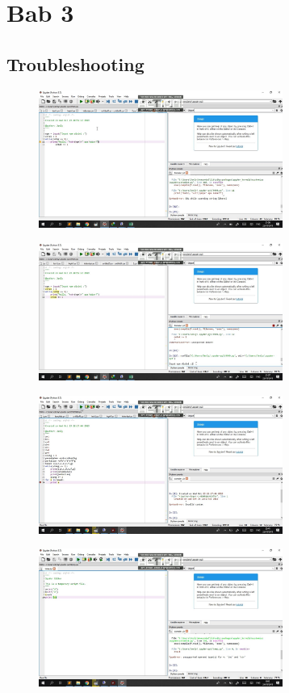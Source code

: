 \chapter{Bab 3}

\section{Troubleshooting}

\begin{figure}[H]
	\centering
	\includegraphics[width=8cm]{figures/2er.jpg}
\end{figure}

\begin{figure}[H]
	\centering
	\includegraphics[width=8cm]{figures/2er1.jpg}
\end{figure}

\begin{figure}[H]
	\centering
	\includegraphics[width=8cm]{figures/8er.jpg}
\end{figure}

\begin{figure}[H]
	\centering
	\includegraphics[width=8cm]{figures/12er.jpg}
\end{figure}

